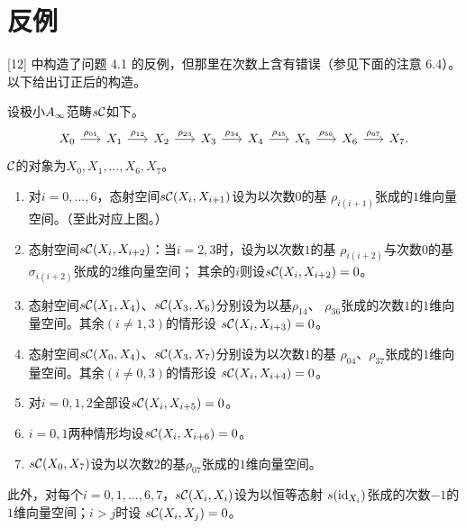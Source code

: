 
\section{反例}
\label{sec:c05}

[12] 中构造了问题 4.1 的反例，但那里在次数上含有错误（参见下面的注意 6.4）。以下给出订正后的构造。

\begin{example}
  设极小$A_{\infty}$范畴$s\mathcal{C}$如下。
  \[
  \begin{tikzcd}[column sep=1.6em, row sep=1em]
    X_0 \arrow[r,"\rho_{01}"]
    & X_1 \arrow[r,"\rho_{12}"]
    & X_2 \arrow[r,"\rho_{23}"]
    & X_3 \arrow[r,"\rho_{34}"]
    & X_4 \arrow[r,"\rho_{45}"]
    & X_5 \arrow[r,"\rho_{56}"]
    & X_6 \arrow[r,"\rho_{67}"]
    & X_7.
  \end{tikzcd}
  \]
  $\mathcal{C}$的对象为$X_0,X_1,\dots,X_6,X_7$。
  \begin{enumerate}[label=(\roman*),leftmargin=2.8em,labelsep=0.4em,
                    itemsep=2pt,topsep=4pt,parsep=0pt]
  \item 对$i=0,\dots,6$，态射空间$s\mathcal{C}(X_i,X_{i+1})$设为以次数$0$的基
        $\rho_{i(i+1)}$张成的$1$维向量空间。（至此对应上图。）
  \item 态射空间$s\mathcal{C}(X_i,X_{i+2})$：当$i=2,3$时，设为以次数$1$的基
        $\rho_{i(i+2)}$与次数$0$的基$\sigma_{i(i+2)}$张成的$2$维向量空间；
        其余的$i$则设$s\mathcal{C}(X_i,X_{i+2})=0$。
  \item 态射空间$s\mathcal{C}(X_1,X_4)$、$s\mathcal{C}(X_3,X_6)$分别设为以基$\rho_{14}$、
        $\rho_{36}$张成的次数$1$的$1$维向量空间。其余$(i\neq1,3)$的情形设
        $s\mathcal{C}(X_i,X_{i+3})=0$。
  \item 态射空间$s\mathcal{C}(X_0,X_4)$、$s\mathcal{C}(X_3,X_7)$分别设为以次数$1$的基
        $\rho_{04}$、$\rho_{37}$张成的$1$维向量空间。其余$(i\neq0,3)$的情形设
        $s\mathcal{C}(X_i,X_{i+4})=0$。
  \item 对$i=0,1,2$全部设$s\mathcal{C}(X_i,X_{i+5})=0$。
  \item $i=0,1$两种情形均设$s\mathcal{C}(X_i,X_{i+6})=0$。
  \item $s\mathcal{C}(X_0,X_7)$设为以次数$2$的基$\rho_{07}$张成的$1$维向量空间。
  \end{enumerate}
  此外，对每个$i=0,1,\dots,6,7$，$s\mathcal{C}(X_i,X_i)$设为以恒等态射
  $s(\mathrm{id}_{X_i})$张成的次数$-1$的$1$维向量空间；$i>j$时设
  $s\mathcal{C}(X_i,X_j)=0$。


\end{example}
